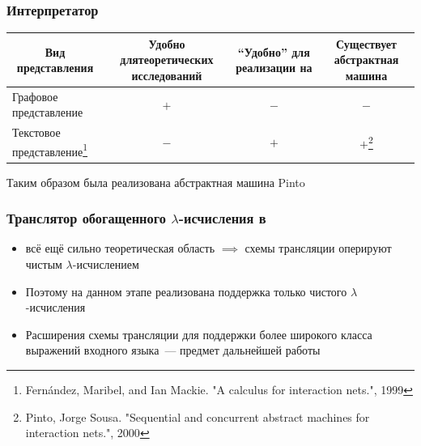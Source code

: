 \documentclass
  [ russian
  , aspectratio=169 %
  ] {beamer}
\begin{document}
\begin{frame}
    \frametitle{Интерпретатор \INs{}}

    \begin{center}
        \begin{tabular}{lccc}
            \toprule
            \multicolumn{1}{c}{Вид представления}
             & \multicolumn{1}{p{2.5cm}}{\raggedright Удобно для\newline теоретических исследований}
             & \multicolumn{1}{p{2.5cm}}{\raggedright \enquote{Удобно} для реализации на \Haskell{}}
             & \multicolumn{1}{p{2.1cm}}{\raggedright Существует абстрактная машина}                                              \\
            \midrule
            Графовое представление
             & $+$
             & $-$
             & $-$                                                                                                                \\
            Текстовое представление\footnote[frame]{Fernández, Maribel, and Ian Mackie. "A calculus for interaction nets.", 1999}
             & $-$
             & $+$
             & $+$\footnote[frame]{Pinto, Jorge Sousa. "Sequential and concurrent abstract machines for interaction nets.", 2000} \\
            \bottomrule
        \end{tabular}
    \end{center}

    \vspace{1em}

    Таким образом была реализована абстрактная машина Pinto

\end{frame}

\begin{frame}
    \frametitle{Транслятор обогащенного $\lambda$-исчисления в \INs{}}

    \begin{itemize}
        \item \INs{} всё ещё сильно теоретическая область $\implies$ схемы трансляции оперируют чистым $\lambda$-исчислением
        \item Поэтому на данном этапе реализована поддержка только чистого $\lambda$-исчисления
        \item Расширения схемы трансляции для поддержки более широкого класса выражений входного языка~--- предмет дальнейшей работы
    \end{itemize}

\end{frame}
\end{document}

